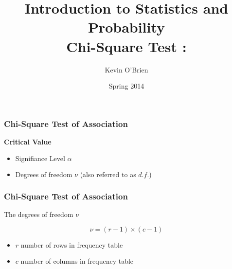 \documentclass[a4]{beamer}
\title[Stats-Lab.com]{\LARGE Introduction to Statistics and Probability \\ {\Large Chi-Square Test : }}
\author[Kevin O'Brien]{Kevin O'Brien}
\date{Spring 2014}
\begin{document}
\begin{frame}
\titlepage
\end{frame}
\begin{frame}
\frametitle{Chi-Square Test of Association}

\Large
\textbf{Critical Value}

\begin{itemize}
\item Signifiance Level $\alpha$
\item Degrees of freedom $\nu$ (also referred to as $d.f.$)
\end{itemize}

\end{frame}
\begin{frame}
\frametitle{Chi-Square Test of Association}
\Large
\vspace{-1cm}
The degrees of freedom $\nu$

\[ \nu  = (r-1) \times (c-1) \]


\begin{itemize}
\item $r$ number of rows in frequency table
\item $c$ number of columns in frequency table
\end{itemize}

\end{frame}
\end{document}
